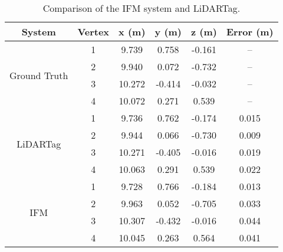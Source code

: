 \begin{table}[H]
	\caption{Comparison of the IFM system and LiDARTag.}
	\begin{center}
		\begin{tabular}{c|c|c|c|c|c}
			\hline\hline
				System & Vertex & x (m) &y (m)& z (m) & Error (m)\\ \hline
				\multirow{4}{*}{Ground Truth } &1 &9.739 & 0.758 & -0.161 & --  \\  \cline{2-6} 
				&2 &9.940 & 0.072 & -0.732 & -- \\  \cline{2-6} 
				&3 &10.272 & -0.414 & -0.032 & -- \\  \cline{2-6} 
				\cite{lt} &4 &10.072 & 0.271 & 0.539 & --\\  \hline
				\multirow{4}{*}{LiDARTag } &1 & 9.736 & 0.762 & -0.174 & 0.015\\  \cline{2-6} 
				&2 &9.944 & 0.066 & -0.730 & 0.009 \\  \cline{2-6} 
				&3 &10.271 & -0.405 & -0.016 & 0.019 \\  \cline{2-6} 
				\cite{lt} &4 & 10.063 & 0.291 & 0.539 & 0.022\\  \hline
				\multirow{4}{*}{IFM } &1 &9.728 & 0.766 & -0.184 & 0.013\\  \cline{2-6} 
				&2 & 9.963 & 0.052 & -0.705 & 0.033 \\  \cline{2-6} 
				&3 &10.307 & -0.432 & -0.016 & 0.044 \\  \cline{2-6} 
				&4 &10.045 & 0.263 & 0.564 & 0.041 \\  \hline\hline
		\end{tabular}
		\label{tab3}
	\end{center}
\end{table}
